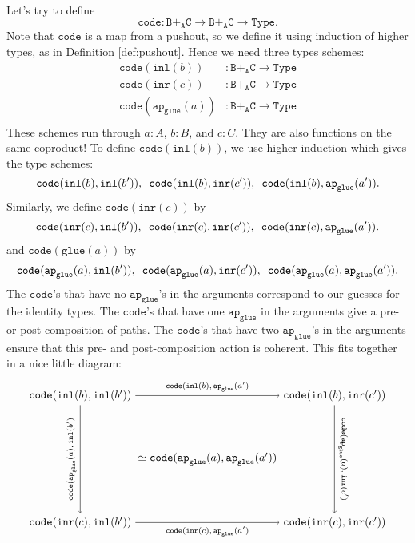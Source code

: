 \documentclass[12pt]{amsart}
\newcommand{\from}{\colon}
\newcommand{\type}[1]{\mathtt{#1}}
\newcommand{\tin}{\colon}
\newcommand{\A}{\type{A}}
\newcommand{\B}{\type{B}}
\newcommand{\C}{\type{C}}
\newcommand{\BAC}{\B +_{\A} \C}
\newcommand{\Type}{\type{Type}}
\newcommand{\ap}{\type{ap}}
\newcommand{\inl}{\type{inl}}
\newcommand{\inr}{\type{inr}}
\newcommand{\glue}{\type{glue}}
\newcommand{\code}{\type{code}}
\theoremstyle{remark}
\theoremstyle{definition}
\begin{document}
Let's try to define 
\[
	\code \from 
	\BAC \to \BAC \to \Type.
\]  
Note that $\code$ is a map from a pushout, 
so we define it using induction of higher types, 
as in Definition \ref{def:pushout}.
Hence we need three types schemes:
\begin{align*}
	\code(\inl(b)) & \from \BAC \to \Type \\
	\code(\inr(c)) & \from \BAC \to \Type \\
	\code( \ap_{\glue} (a) ) & \from \BAC \to \Type \\
\end{align*}
These schemes run through 
$a \tin A$, $b \tin B$, and $c \tin C$.  
They are also functions on the same coproduct!
To define $\code(\inl(b))$, 
we use higher induction which gives the type schemes:
\[
	\code(\inl(b),\inl(b')), \hspace{0.5em}
	\code(\inl(b),\inr(c')), \hspace{0.5em}
	\code(\inl(b),\ap_{\glue}(a')).
\]
Similarly, we define $\code(\inr(c))$ by
\[
	\code(\inr(c),\inl(b')), \hspace{0.5em}
	\code(\inr(c),\inr(c')) , \hspace{0.5em}
	\code(\inr(c),\ap_{\glue}(a')).
\]
and $\code(\glue(a))$ by 
\[
	\code(\ap_{\glue}(a),\inl(b')), \hspace{0.5em}
	\code(\ap_{\glue}(a),\inr(c')) , \hspace{0.5em} 
	\code(\ap_{\glue}(a),\ap_{\glue}(a')).
\]
The $\code$'s that have no $\ap_{\glue}$'s in the arguments correspond
to our guesses for the identity types.  The $\code$'s that have one
$\ap_{\glue}$ in the arguments give a pre- or post-composition of
paths.  The $\code$'s that have two $\ap_{\glue}$'s in the arguments
ensure that this pre- and post-composition action is coherent.  This
fits together in a nice little diagram:
\[ %
	\begin{tikzpicture}
		\node (AA) at (0,0) 
			{ $ \simeq \type{ code } ( \ap_{\glue} ( a ) , \ap_{\glue} ( a' )  )$ }; 
		\node (BB) at (-4,2) 
			{ $ \type{ code } ( \inl( b ) , \inl( b' )  )$ }; 
		\node (BC) at (4,2) 
			{ $ \type{ code } ( \inl( b ) , \inr( c' )  )$ }; 
		\node (CB) at (-4,-2) 
			{ $ \type{ code } ( \inr( c ) , \inl( b' )  )$ }; 
		\node (CC) at (4,-2) 
			{ $ \type{ code } ( \inr( c ) , \inr( c' )  )$ }; 
		\draw [->] (BB) to 
			node 
				[above] 
				{\scriptsize $ \type{ code } ( \inl( b ) , \ap_{\glue} ( a' ) $ } 
			(BC);
		\draw [->] (BB) to 	
			node 
				[rotate=90,above] 
				{ \scriptsize $ \type{ code } ( \ap_{\glue} ( a ) , \inl( b' ) $ } 
			(CB);
		\draw [->] (BC) to 
			node 
				[rotate=-90, above] 
				{\scriptsize $\type{ code } ( \ap_{\glue} ( a ) , \inr( c' ) $} 
			(CC);
		\draw [->] (CB) to 	
			node 
				[below] 
				{ \scriptsize $ \type{ code } ( \inr( c ) , \ap_{\glue} ( a' ) $ } 
			(CC);
	\end{tikzpicture}
\]
\end{document}
